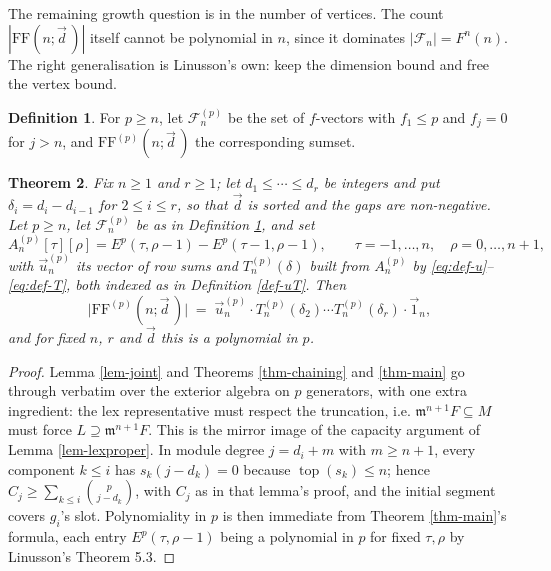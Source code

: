 \documentclass[11pt, a4paper, abstract=yes]{scrartcl}
\theoremstyle{definition}
\newtheorem{definition}{Definition}
\theoremstyle{remark}
\theoremstyle{plain}
\newtheorem{theorem}[definition]{Theorem}
\newcommand{\tp}{\operatorname{top}}
\begin{document}
The remaining growth question is in the number of vertices. The count \(|\mathrm{FF}(n;\vec d\,)|\) itself
cannot be polynomial in \(n\), since it dominates \(|\mathcal F_n|=F^n(n)\). The right generalisation
is Linusson's own: keep the dimension bound and free the vertex bound.

\begin{definition}
For \(p\ge n\), let \(\mathcal F_n^{(p)}\) be the set of \(f\)-vectors with \(f_1\le p\) and
\(f_j=0\) for \(j>n\), and \(\mathrm{FF}^{(p)}(n;\vec d\,)\) the corresponding sumset.
\label{def-twoparam}
\end{definition}

\begin{theorem}
Fix \(n\ge1\) and \(r\ge1\); let \(d_1\le\cdots\le d_r\) be integers and put
\(\delta_i=d_i-d_{i-1}\) for \(2\le i\le r\), so that \(\vec d\) is sorted and the gaps are
non-negative. Let \(p\ge n\), let \(\mathcal F_n^{(p)}\) be as in Definition \ref{def-twoparam}, and set
\begin{equation}\label{eq:Ap}
  A^{(p)}_n[\tau][\rho]=E^p(\tau,\rho-1)-E^p(\tau-1,\rho-1),
  \qquad \tau=-1,\dots,n,\quad\rho=0,\dots,n+1,
\end{equation}
with \(\vec u^{(p)}_n\) its vector of row sums and \(T^{(p)}_n(\delta)\) built from \(A^{(p)}_n\) by
\eqref{eq:def-u}--\eqref{eq:def-T}, both indexed as in Definition \ref{def-uT}. Then
\begin{equation}\label{eq:auto-20}
  \lvert\mathrm{FF}^{(p)}(n;\vec d\,)\rvert\;=\;\vec u^{(p)}_n\cdot T^{(p)}_n(\delta_2)\cdots T^{(p)}_n(\delta_r)\cdot\vec 1_n ,
\end{equation}
and for fixed \(n\), \(r\) and \(\vec d\) this is a polynomial in \(p\).
\label{thm-poly-p}
\end{theorem}

\begin{proof}
Lemma \ref{lem-joint} and Theorems \ref{thm-chaining} and \ref{thm-main} go through verbatim over the exterior
algebra on \(p\) generators, with one extra ingredient: the lex representative must respect the
truncation, i.e. \(\mathfrak m^{n+1}F\subseteq M\) must force \(L\supseteq\mathfrak m^{n+1}F\). This
is the mirror image of the capacity argument of Lemma \ref{lem-lexproper}. In module degree
\(j=d_i+m\) with \(m\ge n+1\), every component \(k\le i\) has \(s_k(j-d_k)=0\) because
\(\tp(s_k)\le n\); hence \(C_j\ge\sum_{k\le i}\binom p{j-d_k}\), with \(C_j\) as in that lemma's
proof, and the initial segment covers
\(g_i\)'s slot. Polynomiality in \(p\) is then immediate from Theorem \ref{thm-main}'s formula, each
entry \(E^p(\tau,\rho-1)\) being a polynomial in \(p\) for fixed \(\tau,\rho\) by Linusson's
Theorem 5.3.
\end{proof}
\end{document}
